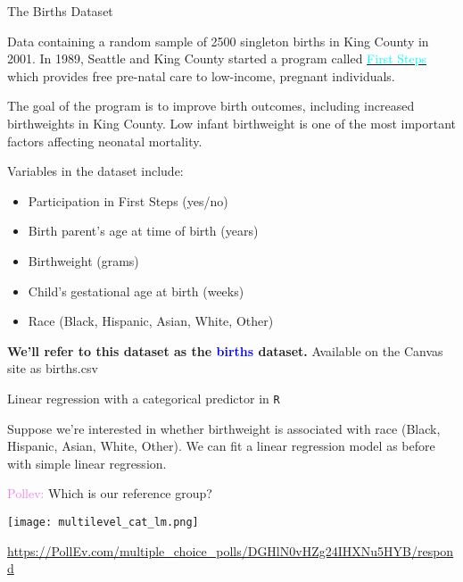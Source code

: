 \documentclass[10pt,t]{beamer}
\begin{document}
\begin{frame}{The Births Dataset}
	\vspace{-5 mm}
	
	Data containing a random sample of 2500 singleton births in King County in 2001. In 1989, Seattle and King County started a program called \href{https://kingcounty.gov/depts/health/child-teen-health/maternity-support-infant-case-management.aspx}{\textcolor{cyan}{First Steps}} which provides free pre-natal care to low-income, pregnant individuals. 
	
	\medskip
	The goal of the program is to improve birth outcomes, including increased birthweights in King County. Low infant birthweight is one of the most important factors affecting neonatal mortality. 

\medskip

Variables in the dataset include:

\medskip
\begin{itemize}
	\item Participation in First Steps (yes/no)
	\item Birth parent's age at time of birth (years)
	\item Birthweight (grams)
	\item Child's gestational age at birth (weeks)
	\item Race (Black, Hispanic, Asian, White, Other)
\end{itemize}

\vspace{0.3cm} 

\textbf{We'll refer to this dataset as the \textcolor{blue}{births} dataset.} Available on the Canvas site as \color{blue} births.csv
\end{frame}

\begin{frame}{Linear regression with a categorical predictor in \texttt{R}}
	\vspace{-7 mm}
	
Suppose we're interested in whether birthweight is associated with race (Black, Hispanic, Asian, White, Other). We can fit a linear regression model as before with simple linear regression.
\medskip

\textcolor{violet}{Pollev:} Which is our reference group?

\vspace{0.3cm}

\centering

\texttt{[image: multilevel\_cat\_lm.png]}


\smallskip
\raggedright
\scriptsize{\url{https://PollEv.com/multiple_choice_polls/DGHlN0vHZg24IHXNu5HYB/respond}}

\end{frame}
\end{document}
